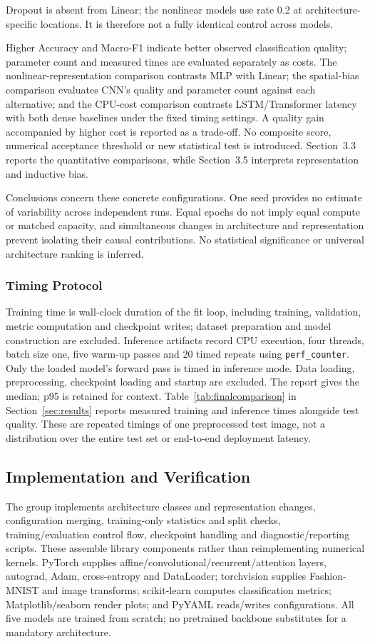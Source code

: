 Dropout is absent from Linear; the nonlinear models use rate 0.2 at architecture-specific locations. It is therefore not a fully identical control across models.

Higher Accuracy and Macro-F1 indicate better observed classification quality; parameter count and measured times are evaluated separately as costs. The nonlinear-representation comparison contrasts MLP with Linear; the spatial-bias comparison evaluates CNN's quality and parameter count against each alternative; and the CPU-cost comparison contrasts LSTM/Transformer latency with both dense baselines under the fixed timing settings. A quality gain accompanied by higher cost is reported as a trade-off. No composite score, numerical acceptance threshold or new statistical test is introduced. Section~3.3 reports the quantitative comparisons, while Section~3.5 interprets representation and inductive bias.

Conclusions concern these concrete configurations. One seed provides no estimate of variability across independent runs. Equal epochs do not imply equal compute or matched capacity, and simultaneous changes in architecture and representation prevent isolating their causal contributions. No statistical significance or universal architecture ranking is inferred.

\subsubsection{Timing Protocol}
Training time is wall-clock duration of the fit loop, including training, validation, metric computation and checkpoint writes; dataset preparation and model construction are excluded. Inference artifacts record CPU execution, four threads, batch size one, five warm-up passes and 20 timed repeats using \texttt{perf\_counter}. Only the loaded model's forward pass is timed in inference mode. Data loading, preprocessing, checkpoint loading and startup are excluded. The report gives the median; p95 is retained for context. Table~\ref{tab:finalcomparison} in Section~\ref{sec:results} reports measured training and inference times alongside test quality. These are repeated timings of one preprocessed test image, not a distribution over the entire test set or end-to-end deployment latency.

\subsection{Implementation and Verification}
The group implements architecture classes and representation changes, configuration merging, training-only statistics and split checks, training/evaluation control flow, checkpoint handling and diagnostic/reporting scripts. These assemble library components rather than reimplementing numerical kernels. PyTorch supplies affine/convolutional/recurrent/attention layers, autograd, Adam, cross-entropy and DataLoader; torchvision supplies Fashion-MNIST and image transforms; scikit-learn computes classification metrics; Matplotlib/seaborn render plots; and PyYAML reads/writes configurations. All five models are trained from scratch; no pretrained backbone substitutes for a mandatory architecture.


